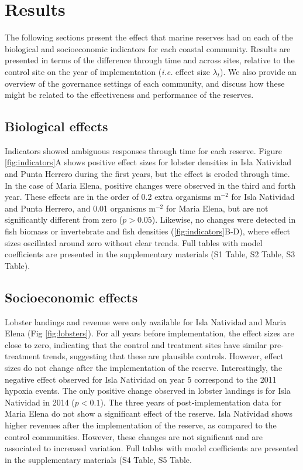 \documentclass{frontiersSCNS}
\theoremstyle{definition}
\theoremstyle{definition}
\theoremstyle{definition}
\theoremstyle{remark}
\begin{document}
\section{Results}\label{results}

The following sections present the effect that marine reserves had on
each of the biological and socioeconomic indicators for each coastal
community. Results are presented in terms of the difference through time
and across sites, relative to the control site on the year of
implementation (\emph{i.e.} effect size \(\lambda_t\)). We also provide
an overview of the governance settings of each community, and discuss
how these might be related to the effectiveness and performance of the
reserves.

\subsection{Biological effects}\label{biological-effects}

Indicators showed ambiguous responses through time for each reserve.
Figure \ref{fig:indicators}A shows positive effect sizes for lobster
densities in Isla Natividad and Punta Herrero during the first years,
but the effect is eroded through time. In the case of Maria Elena,
positive changes were observed in the third and forth year. These
effects are in the order of 0.2 extra organisms \(\mathrm{m}^{-2}\) for
Isla Natividad and Punta Herrero, and 0.01 organisms \(\mathrm{m}^{-2}\)
for Maria Elena, but are not significantly different from zero
(\(p > 0.05\)). Likewise, no changes were detected in fish biomass or
invertebrate and fish densities (\ref{fig:indicators}B-D), where effect
sizes oscillated around zero without clear trends. Full tables with
model coefficients are presented in the supplementary materials (S1
Table, S2 Table, S3 Table).

\subsection{Socioeconomic effects}\label{socioeconomic-effects}

Lobster landings and revenue were only available for Isla Natividad and
Maria Elena (Fig \ref{fig:lobsters}). For all years before
implementation, the effect sizes are close to zero, indicating that the
control and treatment sites have similar pre-treatment trends,
suggesting that these are plausible controls. However, effect sizes do
not change after the implementation of the reserve. Interestingly, the
negative effect observed for Isla Natividad on year 5 correspond to the
2011 hypoxia events. The only positive change observed in lobster
landings is for Isla Natividad in 2014 (\(p < 0.1\)). The three years of
post-implementation data for Maria Elena do not show a significant
effect of the reserve. Isla Natividad shows higher revenues after the
implementation of the reserve, as compared to the control communities.
However, these changes are not significant and are associated to
increased variation. Full tables with model coefficients are presented
in the supplementary materials (S4 Table, S5 Table.
\end{document}
